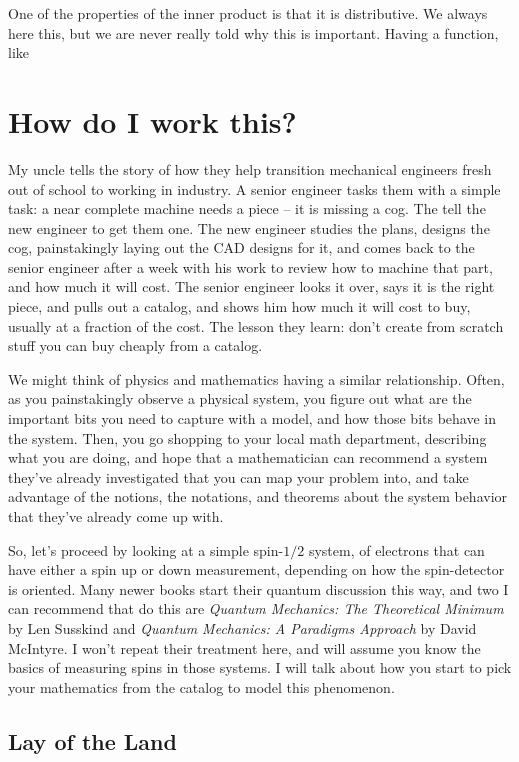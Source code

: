 \documentclass[
]{book}
\begin{document}
One of the properties of the inner product is that it is distributive. We always here this, but we are never really told why this is important. Having a function, like

\hypertarget{how-do-i-work-this}{%
\chapter{How do I work this?}\label{how-do-i-work-this}}

My uncle tells the story of how they help transition mechanical engineers fresh out of school to working in industry. A senior engineer tasks them with a simple task: a near complete machine needs a piece -- it is missing a cog. The tell the new engineer to get them one. The new engineer studies the plans, designs the cog, painstakingly laying out the CAD designs for it, and comes back to the senior engineer after a week with his work to review how to machine that part, and how much it will cost. The senior engineer looks it over, says it is the right piece, and pulls out a catalog, and shows him how much it will cost to buy, usually at a fraction of the cost. The lesson they learn: don't create from scratch stuff you can buy cheaply from a catalog.

We might think of physics and mathematics having a similar relationship. Often, as you painstakingly observe a physical system, you figure out what are the important bits you need to capture with a model, and how those bits behave in the system. Then, you go shopping to your local math department, describing what you are doing, and hope that a mathematician can recommend a system they've already investigated that you can map your problem into, and take advantage of the notions, the notations, and theorems about the system behavior that they've already come up with.

So, let's proceed by looking at a simple spin-\(1/2\) system, of electrons that can have either a spin up or down measurement, depending on how the spin-detector is oriented. Many newer books start their quantum discussion this way, and two I can recommend that do this are \emph{Quantum Mechanics: The Theoretical Minimum} by Len Susskind and \emph{Quantum Mechanics: A Paradigms Approach} by David McIntyre. I won't repeat their treatment here, and will assume you know the basics of measuring spins in those systems. I will talk about how you start to pick your mathematics from the catalog to model this phenomenon.

\hypertarget{lay-of-the-land}{%
\section{Lay of the Land}\label{lay-of-the-land}}
\end{document}
